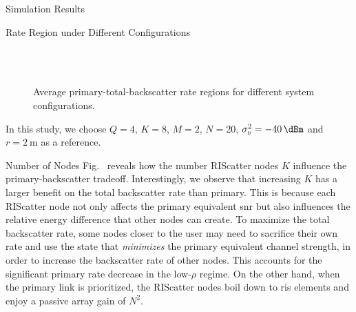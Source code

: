 \documentclass[journal]{IEEEtran}
\begin{document}
\begin{section}{Simulation Results}
	\begin{subsection}{Rate Region under Different Configurations}
		\begin{figure}[!t]
			\centering
			\\
			\\
			\caption{
				Average primary-total-backscatter rate regions for different system configurations.
			}
			\label{fg:region_config}
		\end{figure}
		In this study, we choose $Q=4$, $K=8$, $M=2$, $N=20$, $\sigma_v^2=\qty{-40}{\dBm}$ and $r=\qty{2}{\meter}$ as a reference.
		\begin{subsubsection}{Number of Nodes}
			Fig.~ reveals how the number RIScatter nodes $K$ influence the primary-backscatter tradeoff.
			Interestingly, we observe that increasing $K$ has a larger benefit on the total backscatter rate than primary.
			This is because each RIScatter node not only affects the primary equivalent \gls{snr} but also influences the relative energy difference that other nodes can create.
			To maximize the total backscatter rate, some nodes closer to the user may need to sacrifice their own rate and use the state that \emph{minimizes} the primary equivalent channel strength, in order to increase the backscatter rate of other nodes.
			This accounts for the significant primary rate decrease in the low-$\rho$ regime.
			On the other hand, when the primary link is prioritized, the RIScatter nodes boil down to \gls{ris} elements and enjoy a passive array gain of $N^2$.
		\end{subsubsection}


\end{subsection}
\end{section}
\end{document}

